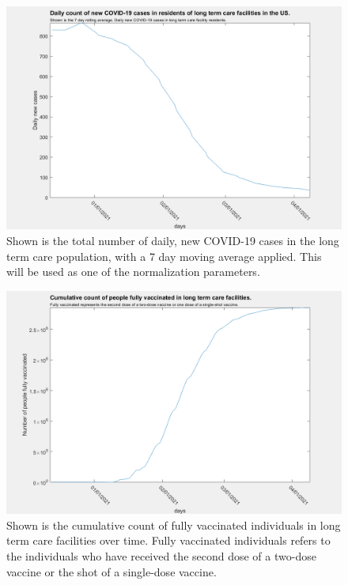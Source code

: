 \documentclass[twoside]{article}
\begin{document}
\begin{multicols}{2}
\begin{figure}[H]
	\includegraphics[width=\linewidth]{images/usa_daily_ltc_cases_processed.png}
	\caption{Shown is the total number of daily, new COVID-19 cases in the long term care population, with a 7 day moving average applied. This will be used as one of the normalization parameters.}
	\label{fig:images/usa_daily_ltc_cases_processedLabel}
\end{figure}

\begin{figure}[H]
	\includegraphics[width=\linewidth]{images/ltc_vac_cumulative.png}
	\caption{Shown is the cumulative count of fully vaccinated individuals in long term care facilities over time. Fully vaccinated individuals refers to the individuals who have received the second dose of a two-dose vaccine or the shot of a single-dose vaccine.}
	\label{fig:images/ltc_vac_cumulativeLabel}
\end{figure}


\end{multicols}
\end{document}

